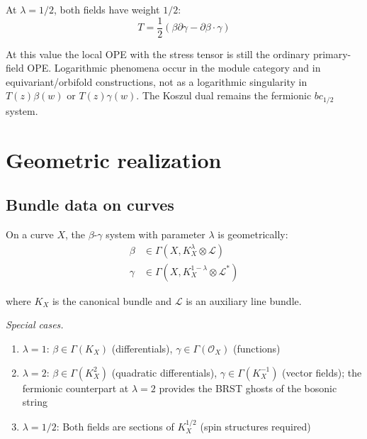 At $\lambda = 1/2$, both fields have weight $1/2$:
\[T = \frac{1}{2}(\beta\partial\gamma - \partial\beta \cdot \gamma)\]

At this value the local OPE with the stress tensor is still the
ordinary primary-field OPE. Logarithmic phenomena occur in the module
category and in equivariant/orbifold constructions, not as a
logarithmic singularity in $T(z)\beta(w)$ or $T(z)\gamma(w)$. The
Koszul dual remains the fermionic $bc_{1/2}$ system.

\section{Geometric realization}

\subsection{Bundle data on curves}

\begin{construction}
\label{const:geometric-beta-gamma}
On a curve $X$, the $\beta$-$\gamma$ system with parameter $\lambda$ is geometrically:
\begin{align}
\beta &\in \Gamma(X, K_X^\lambda \otimes \mathcal{L})\\
\gamma &\in \Gamma(X, K_X^{1-\lambda} \otimes \mathcal{L}^*)
\end{align}

where $K_X$ is the canonical bundle and $\mathcal{L}$ is an auxiliary line bundle.

\emph{Special cases.}
\begin{enumerate}
\item $\lambda = 1$: $\beta \in \Gamma(K_X)$ (differentials), $\gamma \in \Gamma(\mathcal{O}_X)$ (functions)
\item $\lambda = 2$: $\beta \in \Gamma(K_X^2)$ (quadratic differentials), $\gamma \in \Gamma(K_X^{-1})$ (vector fields); the fermionic counterpart at $\lambda = 2$ provides the BRST ghosts of the bosonic string
\item $\lambda = 1/2$: Both fields are sections of $K_X^{1/2}$ (spin structures required)
\end{enumerate}
\end{construction}

